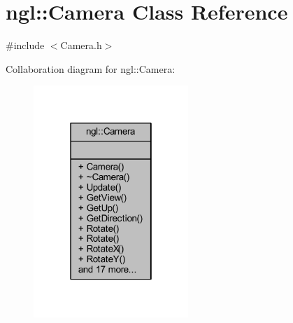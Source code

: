 \hypertarget{classngl_1_1_camera}{}\section{ngl\+:\+:Camera Class Reference}
\label{classngl_1_1_camera}


{\ttfamily \#include $<$Camera.\+h$>$}



Collaboration diagram for ngl\+:\+:Camera\+:
\nopagebreak
\begin{figure}[H]
\begin{center}
\leavevmode
\includegraphics[width=166pt]{classngl_1_1_camera__coll__graph}
\end{center}
\end{figure}
